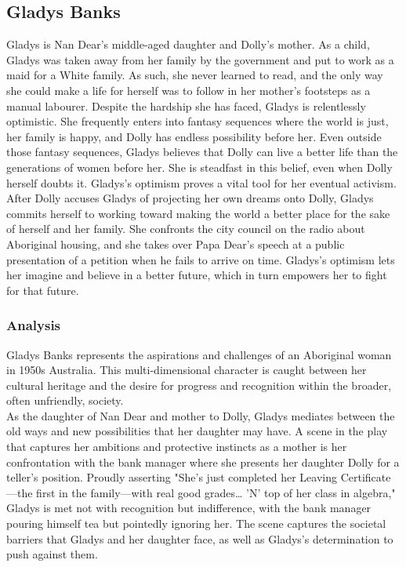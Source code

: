 \documentclass[a4paper]{article}
\begin{document}
\subsection{Gladys Banks}
Gladys is Nan Dear’s middle-aged daughter
and Dolly’s mother. As a child, Gladys was taken away from her
family by the government and put to work as a maid for a White
family. As such, she never learned to read, and the only way she
could make a life for herself was to follow in her mother’s
footsteps as a manual labourer. Despite the hardship she has
faced, Gladys is relentlessly optimistic. She frequently enters
into fantasy sequences where the world is just, her family is
happy, and Dolly has endless possibility before her. Even
outside those fantasy sequences, Gladys believes that Dolly
can live a better life than the generations of women before her.
She is steadfast in this belief, even when Dolly herself doubts it.
Gladys’s optimism proves a vital tool for her eventual activism.
After Dolly accuses Gladys of projecting her own dreams onto
Dolly, Gladys commits herself to working toward making the
world a better place for the sake of herself and her family. She
confronts the city council on the radio about Aboriginal
housing, and she takes over Papa Dear’s speech at a public
presentation of a petition when he fails to arrive on time.
Gladys’s optimism lets her imagine and believe in a better
future, which in turn empowers her to fight for that future.\\

\subsubsection{Analysis}
Gladys Banks represents the aspirations and challenges of an
Aboriginal woman in 1950s Australia. This multi-dimensional
character is caught between her cultural heritage and the
desire for progress and recognition within the broader, often
unfriendly, society.\\

As the daughter of Nan Dear and mother to Dolly, Gladys
mediates between the old ways and new possibilities that her
daughter may have. A scene in the play that captures her
ambitions and protective instincts as a mother is her
confrontation with the bank manager where she presents her
daughter Dolly for a teller's position. Proudly asserting
"She's just
completed her Leaving Certificate—the first in the family—with
real good grades… 'N' top of her class in algebra,"
Gladys is met
not with recognition but indifference, with the bank manager
pouring himself tea but pointedly ignoring her. The scene
captures the societal barriers that Gladys and her daughter
face, as well as Gladys's determination to push against them.\\
\end{document}
